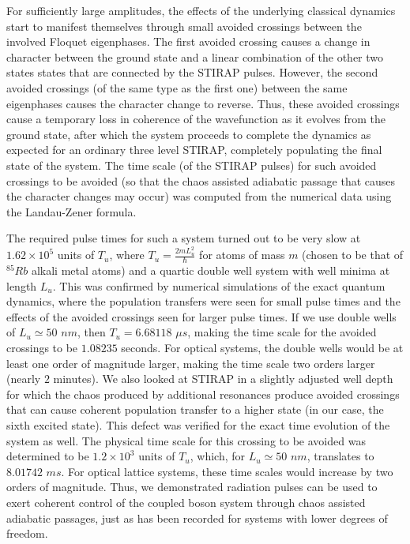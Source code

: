 For sufficiently large amplitudes, the effects of the underlying classical dynamics start to manifest themselves through small avoided crossings between the involved Floquet eigenphases.  The first avoided crossing causes a change in character between the ground state and a linear combination of the other two states states that are connected by the STIRAP pulses. However, the second avoided crossings (of the same type as the first one) between the same eigenphases causes the character change to reverse. Thus, these avoided crossings cause a temporary loss in coherence of the wavefunction as it evolves from the ground state, after which the system proceeds to complete the dynamics as expected for an ordinary three level STIRAP, completely populating the final state of the system. The time scale (of the STIRAP pulses) for such avoided crossings to be avoided (so that the chaos assisted adiabatic passage that causes the character changes may occur) was computed from the numerical data using the Landau-Zener formula. 

The required pulse times for such a system turned out to be very slow at $1.62 \times 10^5$ units of $T_u$, where $T_u=\frac{2mL^2_u} {\hbar}$ for atoms of mass $m$ (chosen to be that of $^{85}Rb$ alkali metal atoms) and a quartic double well system with well minima at length $L_u$. This was confirmed by numerical simulations of the exact quantum dynamics, where the population transfers were seen for small pulse times and the effects of the avoided crossings seen for larger pulse times. If we use double wells of $L_u\simeq 50$ $nm$, then $T_u=6.68118$ $\mu s$, making the time scale for the avoided crossings to be $1.08235$ seconds. For optical systems, the double wells would be at least one order of magnitude larger, making the time scale two orders larger (nearly $2$ minutes). We also looked at STIRAP in a slightly adjusted well depth for which the chaos produced by additional resonances produce avoided crossings that can cause coherent population transfer to a higher state (in our case, the sixth excited state). This defect was verified for the exact time evolution of the system as well. The physical time scale for this crossing to be avoided was determined to be $1.2 \times 10^3$ units of $T_u$, which, for  $L_u\simeq 50$ $nm$, translates to $8.01742$ $ms$. For optical lattice systems, these time scales would increase by two orders of magnitude.  Thus, we demonstrated radiation pulses can be used to exert coherent control of the coupled boson system through chaos assisted adiabatic passages, just as has been recorded for systems with lower degrees of freedom.

